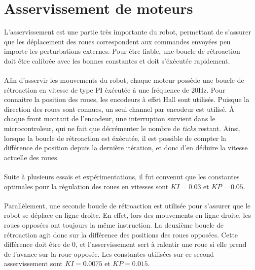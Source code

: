 \section{Asservissement de moteurs}

L'asservissement est une partie très importante du robot, permettant de s'assurer que les déplacement des roues correspondent aux commandes envoyées peu importe les perturbations externes. Pour être fiable, une boucle de rétroaction doit être calibrée avec les bonnes constantes et doit s'éxécutée rapidement.
\paragraph{}
Afin d'asservir les mouvements du robot, chaque moteur possède une boucle de rétroaction en vitesse de type PI éxécutée à une fréquence de 20Hz. Pour connaitre la position des roues, les encodeurs à effet Hall sont utilisés. Puisque la direction des roues sont connues, un seul channel par encodeur est utilisé. À chaque front montant de l'encodeur, une interruption survient dans le microcontroleur, qui ne fait que décrémenter le nombre de \textit{ticks} restant. Ainsi, lorsque la boucle de rétroaction est éxécutée, il est possible de compter la différence de position depuis la dernière itération, et donc d'en déduire la vitesse actuelle des roues. 
\paragraph{}
Suite à plusieurs essais et expérimentations, il fut convenut que les constantes optimales pour la régulation des roues en vitesses sont $KI = 0.03$ et $KP = 0.05$. 
\paragraph{}
Parallèlement, une seconde boucle de rétroaction est utilisée pour s'assurer que le robot se déplace en ligne droite. En effet, lors des mouvements en ligne droite, les roues opposées ont toujours la même instruction. La deuxième boucle de rétroaction agit donc sur la différence des positions des roues opposées. Cette différence doit être de 0, et l'asservissement sert à ralentir une roue si elle prend de l'avance sur la roue opposée. Les constantes utilisées sur ce second asservissement sont $KI = 0.0075$ et $KP = 0.015$.